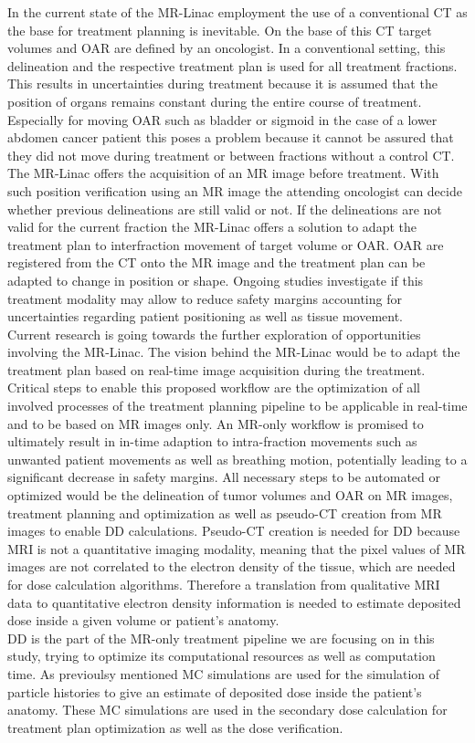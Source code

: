 In the current state of the MR-Linac employment the use of a conventional \ac{CT} as the base for treatment planning is inevitable.
On the base of this \acs{CT} target volumes and \ac{OAR} are defined by an oncologist.
In a conventional setting, this delineation and the respective treatment plan is used for all treatment fractions.
This results in uncertainties during treatment because it is assumed that the position of organs remains constant during the entire course of treatment.
Especially for moving \acs{OAR} such as bladder or sigmoid in the case of a lower abdomen cancer patient this poses a problem because it cannot be assured that they did not move during treatment or between fractions without a control \acs{CT}.
The MR-Linac offers the acquisition of an MR image before treatment.
With such position verification using an MR image the attending oncologist can decide whether previous delineations are still valid or not. If the delineations are not valid for the current fraction the MR-Linac offers a solution to adapt the treatment plan to interfraction movement of target volume or \acs{OAR}.
\acs{OAR} are registered from the CT onto the MR image and the treatment plan can be adapted to change in position or shape.
Ongoing studies investigate if this treatment modality may allow to reduce safety margins accounting for uncertainties regarding patient positioning as well as tissue movement.\\
Current research is going towards the further exploration of opportunities involving the MR-Linac.
The vision behind the MR-Linac would be to adapt the treatment plan based on real-time image acquisition during the treatment.
Critical steps to enable this proposed workflow are the optimization of all involved processes of the treatment planning pipeline to be applicable in real-time and to be based on MR images only.
An MR-only workflow is promised to ultimately result in in-time adaption to intra-fraction movements such as unwanted patient movements as well as breathing motion, potentially leading to a significant decrease in safety margins.
All necessary steps to be automated or optimized would be the delineation of tumor volumes and \acs{OAR} on MR images, treatment planning and optimization as well as pseudo-CT creation from MR images to enable \acs{DD} calculations.
Pseudo-CT creation is needed for \acs{DD} because \acs{MRI} is not a quantitative imaging modality, meaning that the pixel values of MR images are not correlated to the electron density of the tissue, which are needed for dose calculation algorithms.
Therefore a translation from qualitative MRI data to quantitative electron density information is needed to estimate deposited dose inside a given volume or patient's anatomy.\\
\acs{DD} is the part of the MR-only treatment pipeline we are focusing on in this study, trying to optimize its computational resources as well as computation time. 
As previoulsy mentioned \acs{MC} simulations are used for the simulation of particle histories to give an estimate of deposited dose inside the patient's anatomy.
These \acs{MC} simulations are used in the secondary dose calculation for treatment plan optimization as well as the dose verification.

